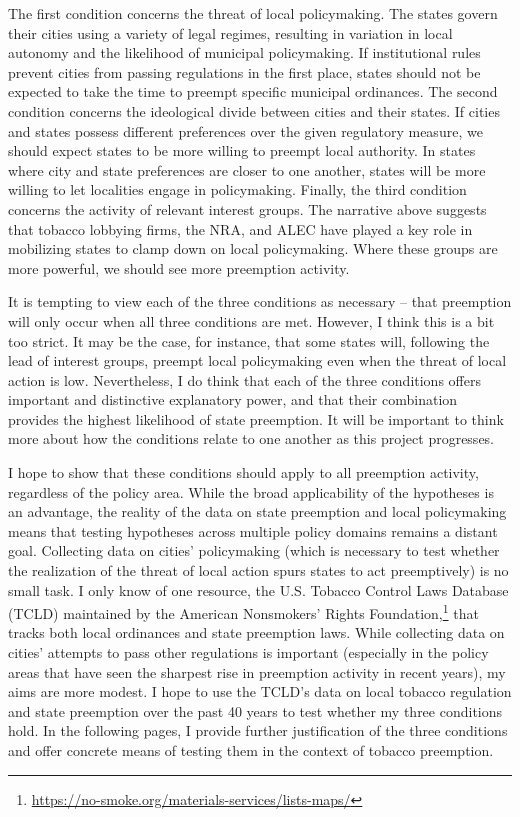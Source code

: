 \documentclass[12pt]{article}
\begin{document}
The first condition concerns the threat of local policymaking. The states govern their cities using a variety of legal regimes, resulting in variation in local autonomy and the likelihood of municipal policymaking. If institutional rules prevent cities from passing regulations in the first place, states should not be expected to take the time to preempt specific municipal ordinances. The second condition concerns the ideological divide between cities and their states. If cities and states possess different preferences over the given regulatory measure, we should expect states to be more willing to preempt local authority. In states where city and state preferences are closer to one another, states will be more willing to let localities engage in policymaking. Finally, the third condition concerns the activity of relevant interest groups. The narrative above suggests that tobacco lobbying firms, the NRA, and ALEC have played a key role in mobilizing states to clamp down on local policymaking. Where these groups are more powerful, we should see more preemption activity. 

It is tempting to view each of the three conditions as necessary -- that preemption will only occur when all three conditions are met. However, I think this is a bit too strict. It may be the case, for instance, that some states will, following the lead of interest groups, preempt local policymaking even when the threat of local action is low. Nevertheless, I do think that each of the three conditions offers important and distinctive explanatory power, and that their combination provides the highest likelihood of state preemption. It will be important to think more about how the conditions relate to one another as this project progresses.

I hope to show that these conditions should apply to all preemption activity, regardless of the policy area. While the broad applicability of the hypotheses is an advantage, the reality of the data on state preemption and local policymaking means that testing hypotheses across multiple policy domains remains a distant goal. Collecting data on cities' policymaking (which is necessary to test whether the realization of the threat of local action spurs states to act preemptively) is no small task. I only know of one resource, the U.S. Tobacco Control Laws Database (TCLD) maintained by the American Nonsmokers' Rights Foundation,\footnote{\url{https://no-smoke.org/materials-services/lists-maps/}} that tracks both local ordinances and state preemption laws. While collecting data on cities' attempts to pass other regulations is important (especially in the policy areas that have seen the sharpest rise in preemption activity in recent years), my aims are more modest. I hope to use the TCLD's data on local tobacco regulation and state preemption over the past 40 years to test whether my three conditions hold. In the following pages, I provide further justification of the three conditions and offer concrete means of testing them in the context of tobacco preemption. 
\end{document}
